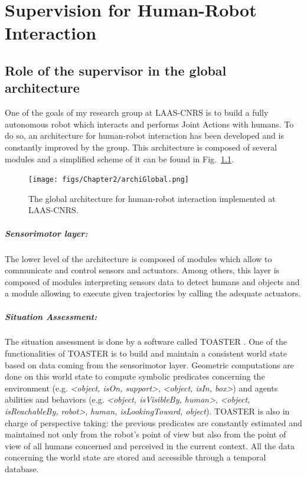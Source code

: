 \documentclass[english,a4paper,11pt,twoside]{StyleThese}
\begin{document}
\setcounter{chapter}{1} %
\dominitoc
\faketableofcontents
\fi

\chapter{Supervision for Human-Robot Interaction}
\minitoc

\label{ch:Sup}

\section{Role of the supervisor in the global architecture}

\label{sec:globalArchi}

One of the goals of my research group at LAAS-CNRS is to build a fully autonomous robot which interacts and performs Joint Actions with humans. To do so, an architecture for human-robot interaction has been developed and is constantly improved by the group. This architecture is composed of several modules and a simplified scheme of it can be found in Fig.~\ref{fig:GlobalArchi}.

\begin{figure}[!h]
	\centering
    \texttt{[image: figs/Chapter2/archiGlobal.png]}
    \caption{The global architecture for human-robot interaction implemented at LAAS-CNRS.}
    \label{fig:GlobalArchi}
\end{figure}

\paragraph{Sensorimotor layer:}
The lower level of the architecture is composed of modules which allow to communicate and control sensors and actuators. Among others, this layer is composed of modules interpreting sensors data to detect humans and objects and a module allowing to execute given trajectories by calling the adequate actuators.

\paragraph{Situation Assessment:}
The situation assessment is done by a software called TOASTER \cite{milliezThesis}. One of the functionalities of TOASTER is to build and maintain a consistent world state based on data coming from the sensorimotor layer. Geometric computations are done on this world state to compute symbolic predicates concerning the environment (e.g. \textit{<object, isOn, support>}, \textit{<object, isIn, box>}) and agents abilities and behaviors (e.g. \textit{<object, isVisibleBy, human>}, \textit{<object, isReachableBy, robot>}, \textit{human, isLookingToward, object}). TOASTER is also in charge of perspective taking: the previous predicates are constantly estimated and maintained not only from the robot’s point of view but also from the point of view of all humans concerned and perceived in the current context. All the data concerning the world state are stored and accessible through a temporal database.
\end{document}
